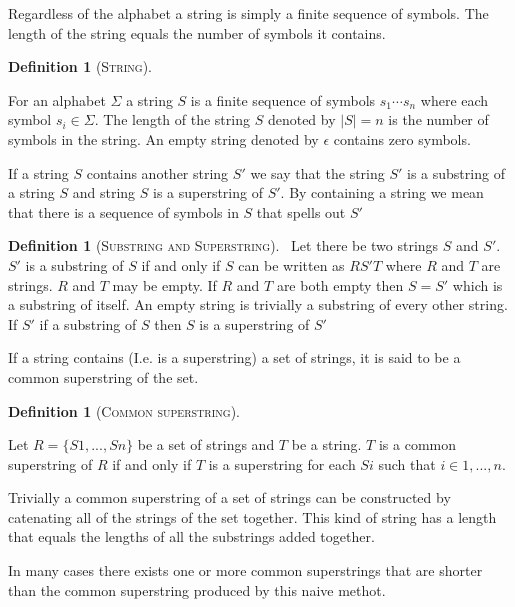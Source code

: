 \documentclass[english,twoside,censored,csm,algorithms-track-2020]{HYthesisML}
\theoremstyle{plain}
\theoremstyle{definition}
\newtheorem{definition}[equation]{Definition}
\begin{document}
Regardless of the alphabet a string is simply a finite sequence of symbols. The length of the string equals the number of symbols it contains. 

\begin{definition}[\textsc{String}]~\label{def-string}
  
  For an alphabet $\Sigma$ a string $S$ is a finite sequence of symbols  ${s_1\cdots s_n}$ where each symbol $s_i \in \Sigma$.
  The length of the string $S$ denoted by $|S| = n$ is the number of symbols in the string.
  An empty string denoted by $\epsilon$ contains zero symbols.
  
\end{definition}

If a string $S$ contains another string $S'$ we say that the string $S'$ is a substring of a string $S$ and string $S$ is a superstring of $S'$.
By containing a string we mean that there is a sequence of symbols in $S$ that spells out $S'$

\begin{definition}[\textsc{Substring and Superstring}]~\label{def-sub-super}
  Let there be two strings $S$ and $S'$.
  $S'$ is a substring of $S$ if and only if $S$ can be written as $RS'T$ where $R$ and $T$ are strings. $R$ and $T$ may be empty.
  If $R$ and $T$ are both empty then $S = S'$ which is a substring of itself.
  An empty string is trivially a substring of every other string.\\

  If $S'$ if a substring of $S$ then $S$ is a superstring of $S'$
\end{definition}

If a string contains (I.e. is a superstring) a set of strings, it is said to be a common superstring of the set.

\begin{definition}[\textsc{Common superstring}]~\label{def-cs}

  Let $R = \{S1,...,Sn\}$ be a set of strings and $T$ be a string.
  $T$ is a common superstring of $R$ if and only if $T$ is a superstring for each $Si$ such that $i\in 1,...,n$.
  
\end{definition}

Trivially a common superstring of a set of strings can be constructed by catenating all of the strings of the set together.
This kind of string has a length that equals the lengths of all the substrings added together.

In many cases there exists one or more common superstrings that are shorter than the common superstring produced by this naive methot.
\end{document}

